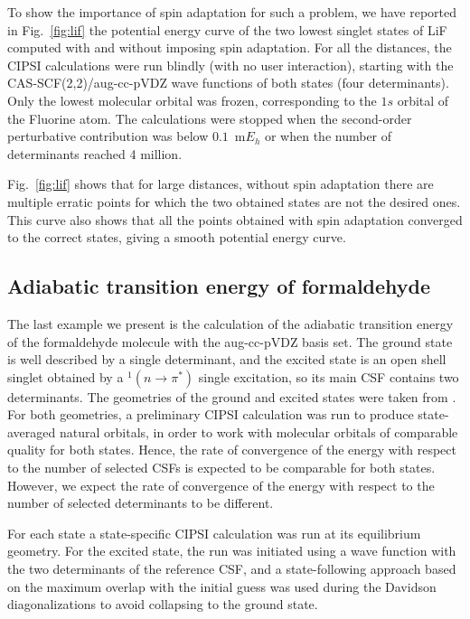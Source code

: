 \documentclass[aip,jcp,reprint,showkeys]{revtex4-1}
\newcommand{\cipsi}{CIPSI}
\newcommand{\csf}{CSF}
\begin{document}
To show the importance of spin adaptation for such a problem, we have reported
in Fig.~\ref{fig:lif} the potential energy curve of the two lowest singlet states of
LiF computed with and without imposing spin adaptation. For all the distances,
the {\cipsi} calculations were run blindly (with no user interaction), starting
with the CAS-SCF(2,2)/aug-cc-pVDZ  wave functions of both states (four
determinants). Only the lowest molecular orbital was frozen, corresponding to
the $1s$ orbital of the Fluorine atom. The calculations were stopped when the
second-order perturbative contribution was below $0.1$~m$E_h$ or when the
number of determinants reached 4 million.

Fig.~\ref{fig:lif} shows that for large distances, without spin adaptation
there are multiple erratic points for which the two obtained states are not
the desired ones. This curve also shows that all the points obtained with spin
adaptation converged to the correct states, giving a smooth potential energy
curve.

\subsection{Adiabatic transition energy of formaldehyde}

The last example we present is the calculation of the adiabatic transition
energy of the formaldehyde molecule with the aug-cc-pVDZ basis set.  The ground
state is well described by a single determinant, and the excited state is an
open shell singlet obtained by a $^1(n \rightarrow \pi^*)$ single excitation,
so its main {\csf} contains two determinants.  The geometries of the ground and
excited states were taken from \citet{Loos_2018}. For both geometries, a
preliminary {\cipsi} calculation was run to produce state-averaged natural
orbitals, in order to work with molecular orbitals of comparable quality for
both states. Hence, the rate of convergence of the energy with respect to the
number of selected {\csf s} is expected to be comparable for both states.
However, we expect the rate of convergence of the energy with respect to the
number of selected determinants to be different. 

For each state a state-specific {\cipsi} calculation was run at its equilibrium
geometry.
For the excited state, the run was initiated using a wave function with
the two determinants of the reference {\csf}, and a state-following approach
based on the maximum overlap with the initial guess was used during the
Davidson diagonalizations to avoid collapsing to the ground state.
\end{document}
